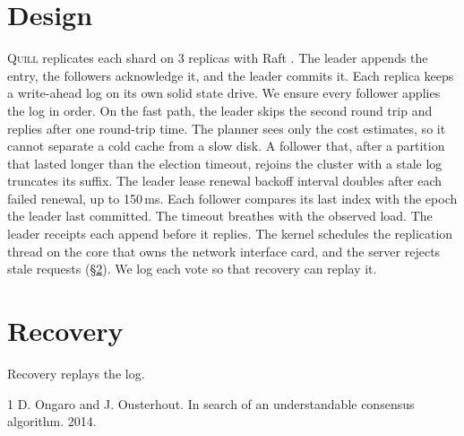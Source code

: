 \documentclass{article}
\newcommand{\Sys}{\textsc{Quill}}
\begin{document}
\section{Design}
\label{sec:design}
\Sys{} replicates each shard on 3 replicas with Raft \cite{raft}.
The leader appends the entry, the followers acknowledge it, and the leader commits it.
Each replica keeps a write-ahead log on its own solid state drive.
We ensure every follower applies the log in order.
On the fast path, the leader skips the second round trip and replies after one round-trip time.
The planner sees only the cost estimates, so it cannot separate a cold cache from a slow disk.
A follower that, after a partition that lasted longer than the election timeout, rejoins the cluster with a stale log truncates its suffix.
The leader lease renewal backoff interval doubles after each failed renewal, up to 150\,ms.
Each follower compares its last index with the epoch the leader last committed.
The timeout breathes with the observed load.
The leader receipts each append before it replies.
The kernel schedules the replication thread on the core that owns the network interface card, and the server rejects stale requests (\S\ref{sec:recovery}).
We log each vote so that recovery can replay it.

\section{Recovery}
\label{sec:recovery}
Recovery replays the log.

\begin{thebibliography}{1}
 D. Ongaro and J. Ousterhout. In search of an understandable consensus algorithm. 2014.
\end{thebibliography}
\end{document}
